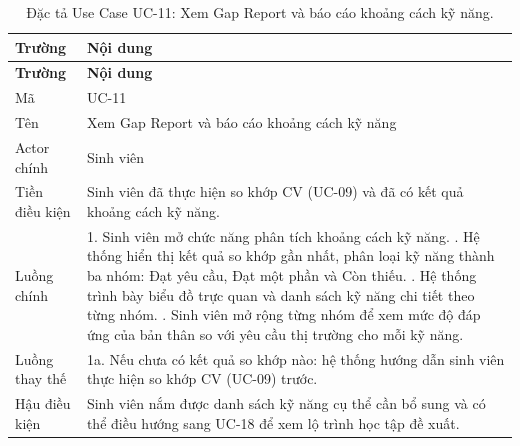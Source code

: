 \begin{longtable}{|L{3.5cm}|L{10cm}|}
\caption{Đặc tả Use Case UC-11: Xem Gap Report và báo cáo khoảng cách kỹ năng.}
\label{tab:uc11} \\
\hline
\textbf{Trường} & \textbf{Nội dung} \\
\hline
\endfirsthead
\hline
\textbf{Trường} & \textbf{Nội dung} \\
\hline
\endhead
Mã & UC-11 \\
\hline
Tên & Xem Gap Report và báo cáo khoảng cách kỹ năng \\
\hline
Actor chính & Sinh viên \\
\hline
Tiền điều kiện & Sinh viên đã thực hiện so khớp CV (UC-09) và đã có kết quả khoảng cách kỹ năng. \\
\hline
Luồng chính & 1. Sinh viên mở chức năng phân tích khoảng cách kỹ năng. . Hệ thống hiển thị kết quả so khớp gần nhất, phân loại kỹ năng thành ba nhóm: Đạt yêu cầu, Đạt một phần và Còn thiếu. . Hệ thống trình bày biểu đồ trực quan và danh sách kỹ năng chi tiết theo từng nhóm. . Sinh viên mở rộng từng nhóm để xem mức độ đáp ứng của bản thân so với yêu cầu thị trường cho mỗi kỹ năng. \\
\hline
Luồng thay thế & 1a. Nếu chưa có kết quả so khớp nào: hệ thống hướng dẫn sinh viên thực hiện so khớp CV (UC-09) trước. \\
\hline
Hậu điều kiện & Sinh viên nắm được danh sách kỹ năng cụ thể cần bổ sung và có thể điều hướng sang UC-18 để xem lộ trình học tập đề xuất. \\
\hline
\end{longtable}

